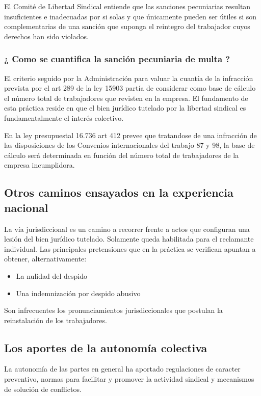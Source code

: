 \documentclass[spanish,12pt,a4paper,titlepage]{report}
\begin{document}
El Comité de Libertad Sindical entiende que las sanciones pecuniarias resultan insuficientes e inadecuadas por si solas y que únicamente pueden ser útiles si son complementarias de una sanción que suponga el reintegro del trabajador cuyos derechos han sido violados.

\subsubsection{¿ Como se cuantifica la sanción pecuniaria de multa ?}

El criterio seguido por la Administración para valuar la cuantía de la infracción prevista por el art 289 de la ley 15903 partía de considerar como base de cálculo el número total de trabajadores que revisten en la empresa. El fundamento de esta práctica reside en que el bien jurídico tutelado por la libertad sindical es fundamentalmente el interés colectivo.

En la ley presupuestal 16.736 art 412 prevee que tratandose de una infracción de las disposiciones de los Convenios internacionales del trabajo 87 y 98, la base de cálculo será determinada en función del número total de trabajadores de la empresa incumplidora.

\subsection{Otros caminos ensayados en la experiencia nacional}

La vía jurisdiccional es un camino a recorrer frente a actos que configuran una lesión del bien jurídico tutelado. Solamente queda habilitada para el reclamante individual. Las principales pretensiones que en la práctica se verifican apuntan a obtener, alternativamente:
\begin{itemize}
\item La nulidad del despido
\item Una indemnización por despido abusivo
\end{itemize}

Son infrecuentes los pronunciamientos jurisdiccionales que postulan la reinstalación de los trabajadores.

\subsection{Los aportes de la autonomía colectiva}

La autonomía de las partes en general ha aportado regulaciones de caracter preventivo, normas para facilitar y promover la actividad sindical y mecanismos de solución de conflictos.
\end{document}
